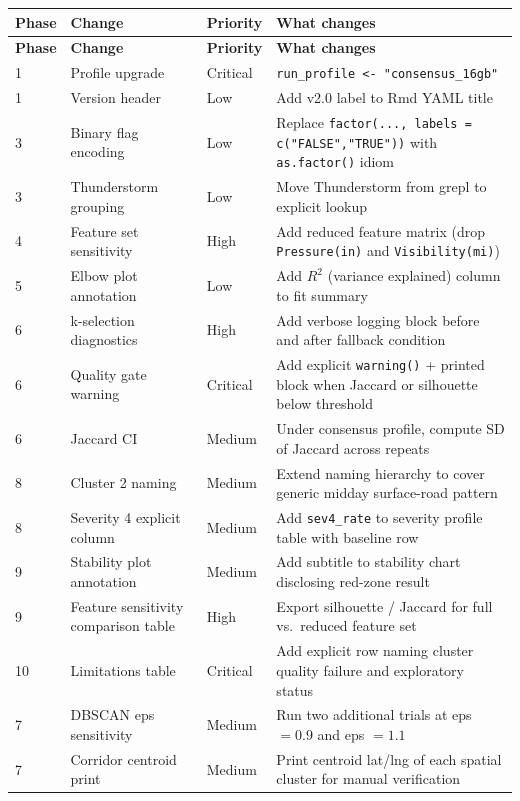 \documentclass[11pt]{article}
\newcommand{\rcode}[1]{\texttt{#1}}
\begin{document}
\begin{longtable}{|p{1.2cm}|p{3.5cm}|p{2cm}|p{6.5cm}|}
\hline
\textbf{Phase} & \textbf{Change} & \textbf{Priority} & \textbf{What changes} \\
\hline
\endfirsthead
\hline
\textbf{Phase} & \textbf{Change} & \textbf{Priority} & \textbf{What changes} \\
\hline
\endhead
1 & Profile upgrade & Critical & \rcode{run\_profile <- "consensus\_16gb"} \\
\hline
1 & Version header & Low & Add v2.0 label to Rmd YAML title \\
\hline
3 & Binary flag encoding & Low & Replace \rcode{factor(..., labels = c("FALSE","TRUE"))} with \rcode{as.factor()} idiom \\
\hline
3 & Thunderstorm grouping & Low & Move Thunderstorm from grepl to explicit lookup \\
\hline
4 & Feature set sensitivity & High & Add reduced feature matrix (drop \rcode{Pressure(in)} and \rcode{Visibility(mi)}) \\
\hline
5 & Elbow plot annotation & Low & Add $R^2$ (variance explained) column to fit summary \\
\hline
6 & k-selection diagnostics & High & Add verbose logging block before and after fallback condition \\
\hline
6 & Quality gate warning & Critical & Add explicit \rcode{warning()} + printed block when Jaccard or silhouette below threshold \\
\hline
6 & Jaccard CI & Medium & Under consensus profile, compute SD of Jaccard across repeats \\
\hline
8 & Cluster 2 naming & Medium & Extend naming hierarchy to cover generic midday surface-road pattern \\
\hline
8 & Severity 4 explicit column & Medium & Add \rcode{sev4\_rate} to severity profile table with baseline row \\
\hline
9 & Stability plot annotation & Medium & Add subtitle to stability chart disclosing red-zone result \\
\hline
9 & Feature sensitivity comparison table & High & Export silhouette / Jaccard for full vs.\ reduced feature set \\
\hline
10 & Limitations table & Critical & Add explicit row naming cluster quality failure and exploratory status \\
\hline
7 & DBSCAN eps sensitivity & Medium & Run two additional trials at eps $= 0.9$ and eps $= 1.1$ \\
\hline
7 & Corridor centroid print & Medium & Print centroid lat/lng of each spatial cluster for manual verification \\
\hline
\end{longtable}
\end{document}
